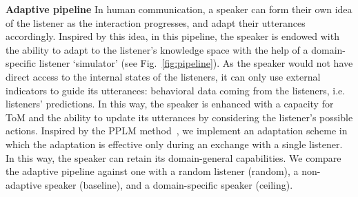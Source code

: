 \noindent\textbf{Adaptive pipeline} %
In human communication, a speaker can form their own idea of the listener as the interaction progresses, and adapt their utterances accordingly. Inspired by this idea, in this pipeline, the speaker is endowed with the ability to adapt to the listener's knowledge space with the help of a domain-specific listener `simulator' (see Fig.~\ref{fig:pipeline}).  As the speaker would not have direct access to the internal states of the listeners, it can only use external indicators to guide its utterances: behavioral data coming from the listeners, i.e. listeners' predictions. In this way, the speaker is enhanced with a capacity for ToM and the ability to update its utterances by considering the listener's possible actions. Inspired by the PPLM method~\cite{dathathri2020plug},  we implement an adaptation scheme in which the adaptation is effective only during an exchange with a single listener. In this way, the speaker can retain its domain-general capabilities. We compare the adaptive pipeline against one with a random listener (random), a non-adaptive speaker (baseline), and a domain-specific speaker (ceiling).



% 